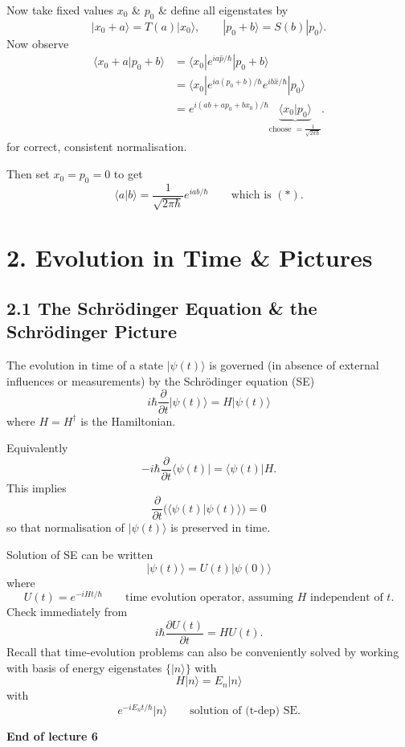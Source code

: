 \documentclass[11pt,a4paper]{article}
\begin{document}
Now take fixed values $x_0$ \& $p_0$ \& define all eigenstates by
\[
    |x_0+a\rangle=T(a)|x_0\rangle,
    \qquad |p_0+b\rangle=S(b)|p_0\rangle.
\]
Now observe
\begin{align*}
    \langle x_0+a|p_0+b\rangle
    &=\langle x_0|e^{ia\hat{p}/\hbar}|p_0+b\rangle\\
    &=\langle x_0|e^{ia(p_0+b)/\hbar}e^{ib\hat{x}/\hbar}|p_0\rangle\\
    &=e^{i(ab+ap_0+bx_0)/\hbar}
      \underbrace{\langle x_0|p_0\rangle}_{\displaystyle\text{choose }=\frac{1}{\sqrt{2\pi\hbar}}}.
\end{align*}
\hfill for correct, consistent normalisation.

Then set $x_0=p_0=0$ to get
\[
    \langle a|b\rangle=\frac{1}{\sqrt{2\pi\hbar}}e^{iab/\hbar}
    \qquad\text{which is }(*).
\]

\section*{2. Evolution in Time \& Pictures}
\subsection*{2.1 The Schr\"odinger Equation \& the Schr\"odinger Picture}

The evolution in time of a state $|\psi(t)\rangle$ is governed
(in absence of external influences or measurements) by the Schr\"odinger equation (SE)
\[
    i\hbar\frac{\partial}{\partial t}|\psi(t)\rangle=H|\psi(t)\rangle
\]
where $H=H^\dagger$ is the Hamiltonian.

Equivalently
\[
    -i\hbar\frac{\partial}{\partial t}\langle\psi(t)|=\langle\psi(t)|H.
\]
This implies
\[
    \frac{\partial}{\partial t}\bigl(\langle\psi(t)|\psi(t)\rangle\bigr)=0
\]
so that normalisation of $|\psi(t)\rangle$ is preserved in time.

Solution of SE can be written
\[
    |\psi(t)\rangle=U(t)|\psi(0)\rangle
\]
where
\[
    U(t)=e^{-iHt/\hbar}
    \qquad\text{time evolution operator, assuming }H\text{ independent of }t.
\]
Check immediately from
\[
    i\hbar\frac{\partial U(t)}{\partial t}=HU(t).
\]
Recall that time-evolution problems can also be conveniently solved by
working with basis of energy eigenstates $\{|n\rangle\}$
with
\[
    H|n\rangle=E_n|n\rangle
\]
with
\[
    e^{-iE_nt/\hbar}|n\rangle
    \qquad\text{solution of (t-dep) SE}.
\]

\begin{center}
    \textbf{End of lecture 6}
\end{center}
\end{document}
